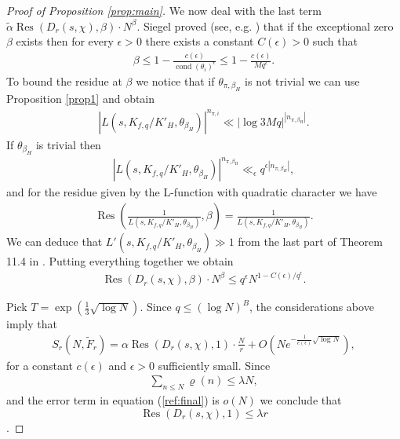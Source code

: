 \documentclass[12pt]{amsart}
\def\le{\leqslant}
\begin{document}
\begin{proof}[Proof of Proposition \ref{prop:main}]
We now deal with the last term $  \tilde{\alpha} \operatorname{Res}(D_r(s,\chi), \beta) \cdot N^{\beta}$.  Siegel proved (see, e.g. \cite[Theorem 5.28]{I-K})  that if the exceptional zero $\beta$ exists then for every $\epsilon >0$ there exists a constant $C(\epsilon)>0$ such that 
\begin{align}
\label{eq:zerobound}
\beta \le 1 - \frac{c(\epsilon)}{\operatorname{cond}(\theta_{i})^{\epsilon} }\le 1 - \frac{c(\epsilon)}{Mq^{\epsilon}}.
\end{align}
To bound the residue at $\beta$ we notice that if $\theta_{\pi, \beta_H}$ is not trivial we can use Proposition \ref{prop1} and obtain
\begin{align*} 
| L(s, K_{f,q} /K'_H, \theta_{\beta_H})|^{n_{\pi, i}} \ll |\log{3Mq}|^{|n_{\pi, \beta_H}|}.
\end{align*}
If $\theta_{\beta_H}$ is trivial then 
\begin{align*}
| L(s, K_{f,q} /K'_H, \theta_{\beta_H})|^{n_{\pi, \beta_H}} \ll_{\epsilon} q^{\epsilon|n_{\pi, \beta_H}|},
\end{align*}
and for the residue given by the L-function with quadratic character we have
\begin{align*}
\operatorname{Res}\left( \frac1{ L(s, K_{f,q} /K'_H, \theta_{\beta_H})}, \beta \right) = \frac1{ L(s, K_{f,q} /K'_H, \theta_{\beta_H})}.
\end{align*}
We can deduce that $ L'(s, K_{f,q} /K'_H, \theta_{\beta_H}) \gg 1$ from the last part of Theorem 11.4 in \cite{M-V2}. Putting everything together we obtain
\begin{align*}
\operatorname{Res}(D_r(s,\chi), \beta) \cdot N^{\beta} \le q^{\epsilon} N^{1 - C(\epsilon)/q^{\epsilon}}.
\end{align*}

Pick $T=\exp\left(\frac{1}{3} \sqrt{\log{N}}\right)$. Since $q \le (\log{N})^B$, the considerations above imply that
\begin{align}
\label{ref:final}
S_r(N, \tilde{F}_r) = \alpha \operatorname{Res}(D_r(s,\chi), 1)\cdot \frac{N}{r} + O(N e^{-\frac{1}{c(\epsilon)} \sqrt{\log{N}}}),
\end{align}
for a constant $c(\epsilon)$ and $\epsilon>0$ sufficiently small. Since
\begin{align*}
\sum_{n\le N}\varrho(n) \le \lambda N, 
\end{align*}
and the error term in equation (\ref{ref:final}) is $o(N)$  we conclude that $$\operatorname{Res}(D_r(s,\chi), 1) \le \lambda r$$. 
\end{proof}
\end{document}
